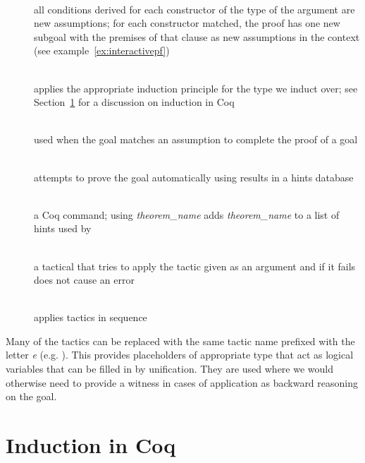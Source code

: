 \begin{description}
 \item[] ~\\
  all conditions derived for each constructor of the type of the argument are new assumptions; for each constructor matched, the proof has one new subgoal with the premises of that clause as new assumptions in the context (see example~\ref{ex:interactivepf})
 \item[] ~\\
  applies the appropriate induction principle for the type we induct over; see Section~\ref{sec:coqinduction} for a discussion on induction in Coq
 \item[] ~\\
  used when the goal matches an assumption to complete the proof of a goal
 \item[] ~\\
  attempts to prove the goal automatically using results in a hints database
 \item[] ~\\
  a Coq command; using  \emph{theorem\_name} adds \emph{theorem\_name} to a list of hints used by 
 \item[] ~\\
  a tactical that tries to apply the tactic given as an argument and if it fails does not cause an error
 \item[\coqtm{;}] ~\\
  applies tactics in sequence
\end{description}

Many of the tactics can be replaced with the same tactic name prefixed with the letter \emph{e} (e.g. ). This provides placeholders of appropriate type that act as logical variables that can be filled in by unification. They are used where we would otherwise need to provide a witness in cases of application as backward reasoning on the goal.



\section{Induction in Coq}
\label{sec:coqinduction}

